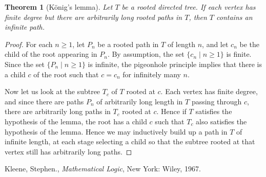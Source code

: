 \documentclass[12pt]{article}
\newtheorem*{theorem*}{Theorem}
\begin{document}
\begin{theorem*}[K\"onig's lemma]
Let $T$ be a rooted directed tree.  If each vertex has finite 
degree but there are arbitrarily long rooted paths in $T$, 
then $T$ contains an infinite path.
\end{theorem*}

\begin{proof}
For each $n\ge 1$, let $P_n$ be a rooted path in $T$ of length $n$,
and let $c_n$ be the child of the root appearing in $P_n$.
By assumption, the set $\{c_n\mid n\ge 1\}$ is finite.  
Since the set $\{P_n\mid n\ge 1\}$ is infinite, the 
pigeonhole principle implies that there is a child $c$ of the root
such that $c=c_n$ for infinitely many $n$.  

Now let us look at the subtree $T_c$ of $T$ rooted at $c$.  Each vertex
has finite degree, and since there are paths $P_n$ of arbitrarily 
long length in $T$ passing through $c$, there are arbitrarily long
paths in $T_c$ rooted at $c$.  Hence if $T$ satisfies the hypothesis
of the lemma, the root has a child $c$ such that $T_c$ also satisfies
the hypothesis of the lemma.  Hence we may inductively build up a
path in $T$ of infinite length, at each stage selecting a child so
that the subtree rooted at that vertex still has arbitrarily long
paths.
\end{proof}



\begin{thebibliography}{9}
Kleene, Stephen., \emph{Mathematical Logic}, New York: Wiley, 1967.
\end{thebibliography}
\end{document}
